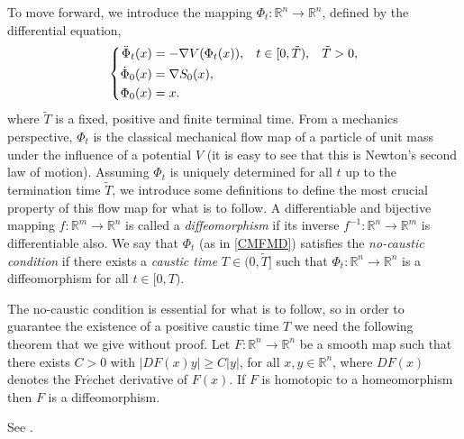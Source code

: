 \documentclass[a4paper,12pt,draft]{report}
\theoremstyle{remark}
\theoremstyle{definition}
\begin{document}
To move forward, we introduce the mapping $\Phi_t :\mathbb{R}^n \to \mathbb{R}^n$, defined by the differential equation,
\begin{equation}
\left\{
\begin{aligned}
\ddot{\Phi}_t(x) & = -\nabla V(\Phi_t(x)), \hspace{0.3cm} t \in [0, \tilde{T}), \hspace{0.3cm} \tilde{T} > 0,\\ \label{CMFMD}
\dot{\Phi}_0(x) & = \nabla S_0(x), \\
\Phi_0(x) & = x.
\end{aligned}
\right.
\end{equation}
where $\tilde{T}$ is a fixed, positive and finite terminal time.  From a mechanics perspective, $\Phi_t$ is the classical mechanical flow map of a particle of unit mass under the influence of a potential $V$ (it is easy to see that this is Newton's second law of motion).  Assuming $\Phi_t$ is uniquely determined for all $t$ up to the termination time $\tilde{T}$, we introduce some definitions to define the most crucial property of this flow map for what is to follow.
{
A differentiable and bijective mapping $f :\mathbb{R}^m \to \mathbb{R}^n$ is called a \emph{diffeomorphism} if its inverse $f^{-1}:\mathbb{R}^n \to \mathbb{R}^m$ is differentiable also.
}
{
We say that $\Phi_t$ (as in \eqref{CMFMD}) satisfies the \emph{no-caustic condition} if there exists a \emph{caustic time} $T \in (0, \tilde{T}]$ such that $\Phi_t :\mathbb{R}^n \to \mathbb{R}^n$ is a diffeomorphism for all $t \in [0, T)$.
}

The no-caustic condition is essential for what is to follow, so in order to guarantee the existence of a positive caustic time $T$ we need the following theorem that we give without proof.
\theorem
{
Let $F :\mathbb{R}^n \to \mathbb{R}^n$ be a smooth map such that there exists $C > 0$ with $|DF(x)y| \ge C|y|$, for all $x, y \in \mathbb{R}^n$, where $DF(x)$ denotes the Fr$\acute{e}$chet derivative of $F(x)$.  If $F$ is homotopic to a homeomorphism then $F$ is a diffeomorphism.
}
\proof
{
See \cite{SEF2}.

\qedhere
}
\end{document}
